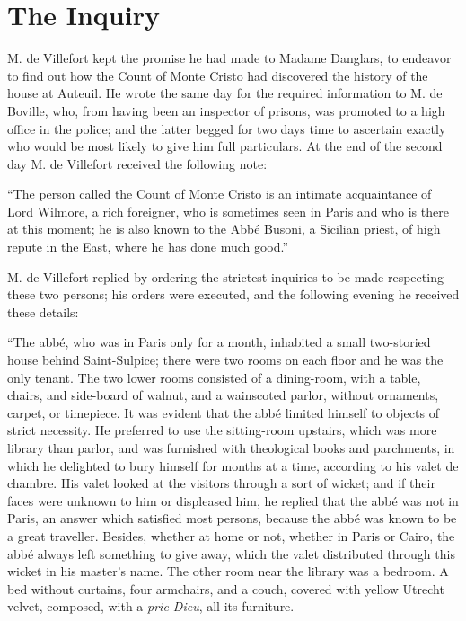 \chapter{The Inquiry}

M. de Villefort kept the promise he had made to Madame Danglars, to
endeavor to find out how the Count of Monte Cristo had discovered the
history of the house at Auteuil. He wrote the same day for the required
information to M. de Boville, who, from having been an inspector of
prisons, was promoted to a high office in the police; and the latter
begged for two days time to ascertain exactly who would be most likely
to give him full particulars. At the end of the second day M. de
Villefort received the following note:

“The person called the Count of Monte Cristo is an intimate
acquaintance of Lord Wilmore, a rich foreigner, who is sometimes seen
in Paris and who is there at this moment; he is also known to the Abbé
Busoni, a Sicilian priest, of high repute in the East, where he has
done much good.”

M. de Villefort replied by ordering the strictest inquiries to be made
respecting these two persons; his orders were executed, and the
following evening he received these details:

“The abbé, who was in Paris only for a month, inhabited a small
two-storied house behind Saint-Sulpice; there were two rooms on each
floor and he was the only tenant. The two lower rooms consisted of a
dining-room, with a table, chairs, and side-board of walnut, and a
wainscoted parlor, without ornaments, carpet, or timepiece. It was
evident that the abbé limited himself to objects of strict necessity.
He preferred to use the sitting-room upstairs, which was more library
than parlor, and was furnished with theological books and parchments,
in which he delighted to bury himself for months at a time, according
to his valet de chambre. His valet looked at the visitors through a
sort of wicket; and if their faces were unknown to him or displeased
him, he replied that the abbé was not in Paris, an answer which
satisfied most persons, because the abbé was known to be a great
traveller. Besides, whether at home or not, whether in Paris or Cairo,
the abbé always left something to give away, which the valet
distributed through this wicket in his master’s name. The other room
near the library was a bedroom. A bed without curtains, four armchairs,
and a couch, covered with yellow Utrecht velvet, composed, with a
\textit{prie-Dieu}, all its furniture.

